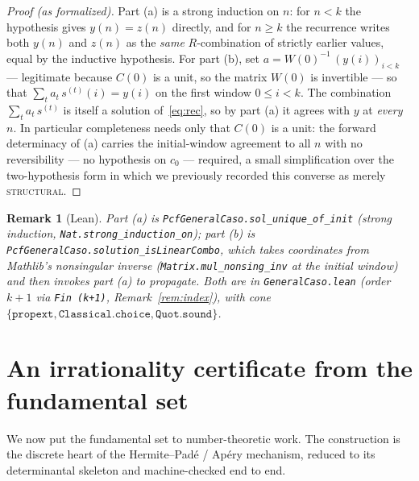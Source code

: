 \documentclass[11pt]{article}
\newtheorem{remark}[theorem]{Remark}
\newcommand{\Caso}{C}
\newcommand{\CasoM}{W}
\begin{document}
\begin{proof}[Proof (as formalized)]
Part (a) is a strong induction on $n$: for $n<k$ the hypothesis gives $y(n)=z(n)$
directly, and for $n\ge k$ the recurrence writes both $y(n)$ and $z(n)$ as the
\emph{same} $R$-combination of strictly earlier values, equal by the inductive
hypothesis. For part (b), set $a=\CasoM(0)^{-1}\,(y(i))_{i<k}$ --- legitimate because
$\Caso(0)$ is a unit, so the matrix $\CasoM(0)$ is invertible --- so that
$\sum_t a_t\,s^{(t)}(i)=y(i)$ on the first window $0\le i<k$. The combination
$\sum_t a_t\,s^{(t)}$ is itself a solution of~\eqref{eq:rec}, so by part (a) it agrees
with $y$ at \emph{every} $n$. In particular completeness needs only that $\Caso(0)$ is a
unit: the forward determinacy of (a) carries the initial-window agreement to all $n$
with no reversibility --- no hypothesis on $c_0$ --- required, a small simplification
over the two-hypothesis form in which we previously recorded this converse as merely
\textsc{structural}.
\end{proof}

\begin{remark}[Lean]\label{rem:converse-lean}
Part (a) is \texttt{PcfGeneralCaso.sol\_unique\_of\_init} (strong induction,
\texttt{Nat.strong\_induction\_on}); part (b) is
\texttt{PcfGeneralCaso.solution\_isLinearCombo}, which takes coordinates from Mathlib's
nonsingular inverse (\texttt{Matrix.mul\_nonsing\_inv} at the initial window) and then
invokes part (a) to propagate. Both are in \texttt{GeneralCaso.lean} (order $k+1$ via
\texttt{Fin (k+1)}, Remark~\ref{rem:index}), with cone
$\{\texttt{propext},\texttt{Classical.choice},\texttt{Quot.sound}\}$.
\end{remark}

\section{An irrationality certificate from the fundamental set}\label{sec:cert}

We now put the fundamental set to number-theoretic work. The construction is the
discrete heart of the Hermite--Pad\'e / Ap\'ery mechanism, reduced to its
determinantal skeleton and machine-checked end to end.
\end{document}
